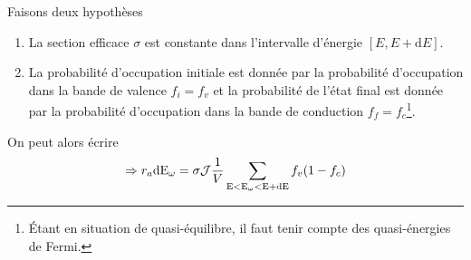 		Faisons deux hypothèses
		\begin{enumerate}
		\item La section efficace $\sigma$ est constante dans l'intervalle d'énergie 
		$[E,E+\text{d}E]$.
		\item La probabilité d'occupation initiale est donnée par la probabilité d'occupation dans 
		la bande de valence $f_i=f_v$ et la probabilité de l'état final est donnée par la probabilité
		d'occupation dans la bande de conduction $f_f=f_c$\footnote{Étant en situation de 
		quasi-équilibre, il faut tenir compte des quasi-énergies de Fermi.}.
		\end{enumerate}
		On peut alors écrire
		\begin{equation}
		\Rightarrow {r_a}{\rm{d}}{{\rm{E}}_\omega } = \sigma {{\cal J}}\frac{1}{V}\sum
		\limits_{{\rm{E < }}{{\rm{E}}_\omega } < {\rm{E + dE}}} {{f_v}(1 - {f_c})} 
		\end{equation}
		
